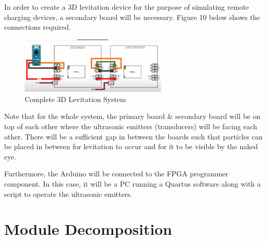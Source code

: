 \documentclass[12pt, titlepage]{article}
\begin{document}
In order to create a 3D levitation device for the purpose of simulating remote charging devices, a secondary board will be necessary. Figure 10 below shows the connections required.
\par 
\begin{figure}[htp]
  \centering
  \includegraphics[width=7cm]{images/Figure10.png}
  \caption[Hardware Complete System]{Complete 3D Levitation System}
  \label{fig:figure10}
\end{figure}

Note that for the whole system, the primary board \& secondary board will be on top of each other where the ultrasonic emitters (transducers) will be facing each other. There will be a sufficient gap in between the boards such that particles can be placed in between for levitation to occur and for it to be visible by the naked eye.
\par
Furthermore, the Arduino will be connected to the FPGA programmer component. In this case, it will be a PC running a Quartus software along with a script to operate the ultrasonic emitters.
\par
\section{Module Decomposition}
\end{document}
